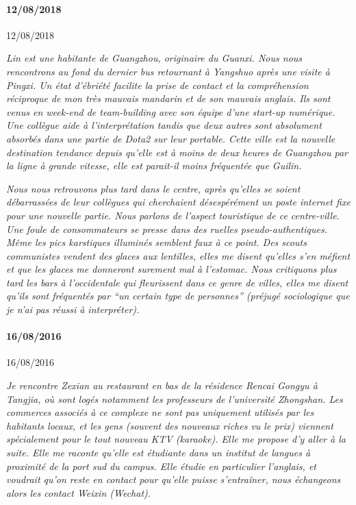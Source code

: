 \paragraph{12/08/2018}{12/08/2018}


\textit{Lin est une habitante de Guangzhou, originaire du Guanxi. Nous nous rencontrons au fond du dernier bus retournant à Yangshuo après une visite à Pingxi. Un état d'ébriété facilite la prise de contact et la compréhension réciproque de mon très mauvais mandarin et de son mauvais anglais. Ils sont venus en week-end de team-building avec son équipe d'une start-up numérique. Une collègue aide à l'interprétation tandis que deux autres sont absolument absorbés dans une partie de Dota2 sur leur portable. Cette ville est la nouvelle destination tendance depuis qu'elle est à moins de deux heures de Guangzhou par la ligne à grande vitesse, elle est parait-il moins fréquentée que Guilin.}

\textit{Nous nous retrouvons plus tard dans le centre, après qu'elles se soient débarrassées de leur collègues qui cherchaient désespérément un poste internet fixe pour une nouvelle partie. Nous parlons de l'aspect touristique de ce centre-ville. Une foule de consommateurs se presse dans des ruelles pseudo-authentiques. Même les pics karstiques illuminés semblent faux à ce point. Des scouts communistes vendent des glaces aux lentilles, elles me disent qu'elles s'en méfient et que les glaces me donneront surement mal à l'estomac. Nous critiquons plus tard les bars à l'occidentale qui fleurissent dans ce genre de villes, elles me disent qu'ils sont fréquentés par ``un certain type de personnes'' (préjugé sociologique que je n'ai pas réussi à interpréter).}


\paragraph{16/08/2016}{16/08/2016}


\textit{Je rencontre Zexian au restaurant en bas de la résidence Rencai Gongyu à Tangjia, où sont logés notamment les professeurs de l'université Zhongshan. Les commerces associés à ce complexe ne sont pas uniquement utilisés par les habitants locaux, et les gens (souvent des nouveaux riches vu le prix) viennent spécialement pour le tout nouveau KTV (karaoke). Elle me propose d'y aller à la suite. Elle me raconte qu'elle est étudiante dans un institut de langues à proximité de la port sud du campus. Elle étudie en particulier l'anglais, et voudrait qu'on reste en contact pour qu'elle puisse s'entraîner, nous échangeons alors les contact Weixin (Wechat).}

